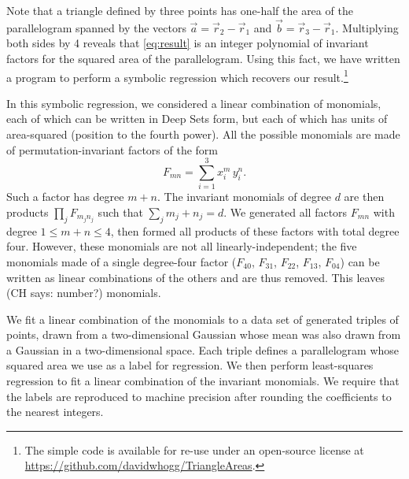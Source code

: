 \documentclass[12pt]{article}
\newcommand{\CH}[1]{{\color{blue} (CH says: #1)}}
\newcommand{\pseudosection}[1]
{}
\begin{document}
\pseudosection{A note on symbolic regression}

Note that a triangle defined by three points has one-half the area of the parallelogram spanned by the vectors $\vec{a} = \vec{r}_2 - \vec{r}_1$ and $\vec{b} = \vec{r}_3 - \vec{r}_1$.
Multiplying both sides by 4 reveals that \eqref{eq:result} is an integer polynomial of invariant factors for the squared area of the parallelogram.
Using this fact, we have written a program to perform a symbolic regression which recovers our result.\footnote{
    The simple code is available for re-use under an open-source license at \url{https://github.com/davidwhogg/TriangleAreas}.
}

In this symbolic regression, we considered a linear combination of monomials, each of which can be written in Deep Sets form, but each of which has units of area-squared (position to the fourth power).
All the possible monomials are made of permutation-invariant factors of the form 
\begin{equation}
F_{mn} = \sum_{i=1}^{3} x_i^m \, y_i^n.
\end{equation}
Such a factor has degree $m + n$.
The invariant monomials of degree $d$ are then products $\prod_j F_{m_j n_j}$ such that $\sum_j m_j + n_j = d$.
We generated all factors $F_{mn}$ with degree $1 \leq m + n \leq 4$, then formed all products of these factors with total degree four.
However, these monomials are not all linearly-independent;
the five monomials made of a single degree-four factor ($F_{40}$, $F_{31}$, $F_{22}$, $F_{13}$, $F_{04}$) can be written as linear combinations of the others and are thus removed.
This leaves \CH{number?} monomials.

We fit a linear combination of the monomials to a data set of generated triples of points, drawn from a two-dimensional Gaussian whose mean was also drawn from a Gaussian in a two-dimensional space.
Each triple defines a parallelogram whose squared area we use as a label for regression.
We then perform least-squares regression to fit a linear combination of the invariant monomials.
We require that the labels are reproduced to machine precision after rounding the coefficients to the nearest integers.

\pseudosection{Generalizations: higher dimensions}
\end{document}
